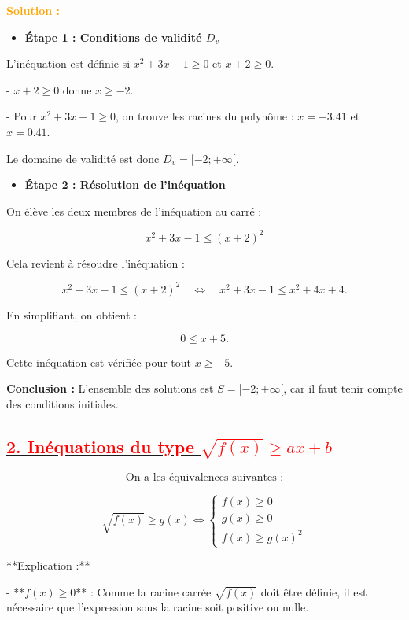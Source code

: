 \documentclass[12pt]{article}
\newcounter{solution}
\newcommand{\solution}{%
  \refstepcounter{solution}%
  \textbf{\textcolor{orange}{Solution \thesolution : }} \ignorespaces
}
\begin{document}
\textbf{\solution}

\begin{itemize}
    \item \textbf{Étape 1 : Conditions de validité \( D_v \)}
\end{itemize}

L'inéquation est définie si \( x^{2} + 3x - 1 \geq 0 \) et \( x + 2 \geq 0 \).

- \( x + 2 \geq 0 \) donne \( x \geq -2 \).

- Pour \( x^{2} + 3x - 1 \geq 0 \), on trouve les racines du polynôme : \( x = -3.41 \) et \( x = 0.41 \).

Le domaine de validité est donc \( D_v = [-2; +\infty[ \).

\begin{itemize}
    \item \textbf{Étape 2 : Résolution de l'inéquation}
\end{itemize}

On élève les deux membres de l'inéquation au carré :

\[
x^{2} + 3x - 1 \leq (x + 2)^{2}
\]

Cela revient à résoudre l'inéquation :

\[
x^{2} + 3x - 1 \leq (x + 2)^{2} \quad \Leftrightarrow \quad x^{2} + 3x - 1 \leq x^{2} + 4x + 4.
\]

En simplifiant, on obtient :

\[
0 \leq x + 5.
\]

Cette inéquation est vérifiée pour tout \( x \geq -5 \).

\textbf{Conclusion :} L'ensemble des solutions est \( S = [-2; +\infty[ \), car il faut tenir compte des conditions initiales.

\subsection*{\underline{\textbf{\textcolor{red}{2. Inéquations du type \( \sqrt{f(x)} \geq ax+b \) }}}}

\[\text{On a les équivalences suivantes :}\]

\[
\sqrt{f(x)} \geq g(x) \Leftrightarrow \begin{cases} 
f(x) \geq 0 \\
g(x) \geq 0 \\
f(x) \geq g(x)^{2}
\end{cases}
\]

**Explication :**  

- **\( f(x) \geq 0 \)** : Comme la racine carrée \( \sqrt{f(x)} \) doit être définie, il est nécessaire que l'expression sous la racine soit positive ou nulle.
\end{document}
